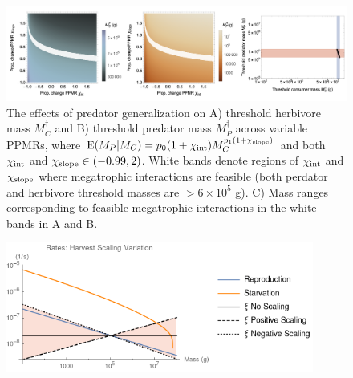 \documentclass[]{rsos}%
\begin{document}
\begin{figure}
  \centering
  \includegraphics[width=1\textwidth]{fig_megamammal_generalist.png}
  \caption{
    The effects of predator generalization on A) threshold herbivore mass $M_C^\dagger$ and B) threshold predator mass $M_P^\dagger$ across variable PPMRs, where ${\rm E}(M_P|M_C) = p_0(1+\chi_{\rm int}) M_C^{p_1(1+\chi_{\rm slope})}$ and both $\chi_{\rm int}$ and $\chi_{\rm slope} \in (-0.99,2)$.
    White bands denote regions of $\chi_{\rm int}$ and $\chi_{\rm slope}$ where megatrophic interactions are feasible (both perdator and herbivore threshold masses are $> 6\times10^5$ g).
    C) Mass ranges corresponding to feasible megatrophic interactions in the white bands in A and B.
  }
  \label{fig:megamammalgen}
\end{figure}

\begin{figure}
  \centering
\includegraphics[width=0.9\textwidth]{harvest_scaling_plot.png}
\caption{
  }
  \label{fig:harvestscaling}
\end{figure}

\clearpage



\end{document}
